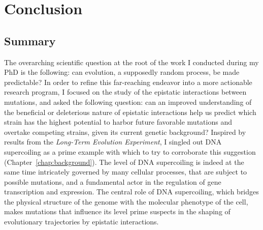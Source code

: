 \chapter{Conclusion}
\label{chap:conclusion}

\section{Summary}

The overarching scientific question at the root of the work I conducted during my PhD is the following: can evolution, a supposedly random process, be made predictable?
In order to refine this far-reaching endeavor into a more actionable research program, I focused on the study of the epistatic interactions between mutations, and asked the following question: can an improved understanding of the beneficial or deleterious nature of epistatic interactions help us predict which strain has the highest potential to harbor future favorable mutations and overtake competing strains, given its current genetic background?
Inspired by results from the \emph{Long-Term Evolution Experiment}, I singled out DNA supercoiling as a prime example with which to try to corroborate this suggestion (Chapter~\ref{chap:background}).
The level of DNA supercoiling is indeed at the same time intricately governed by many cellular processes, that are subject to possible mutations, and a fundamental actor in the regulation of gene transcription and expression.
The central role of DNA supercoiling, which bridges the physical structure of the genome with the molecular phenotype of the cell, makes mutations that influence its level prime suspects in the shaping of evolutionary trajectories by epistatic interactions.

